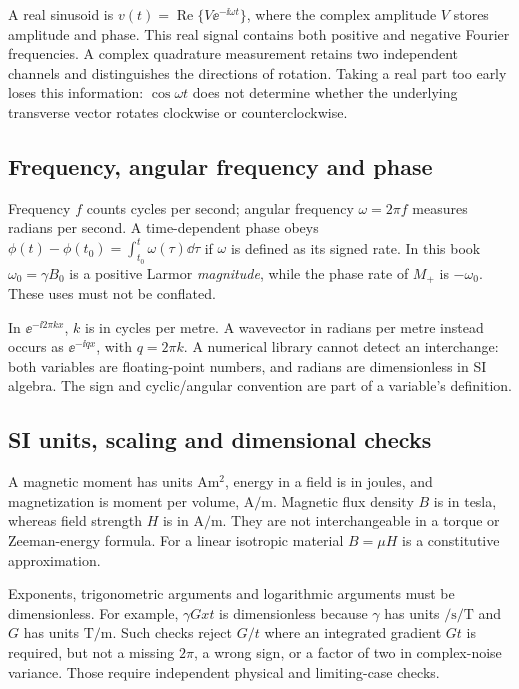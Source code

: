 A real sinusoid is
$v(t)=\operatorname{Re}\{V\ee^{-\ii\omega t}\}$, where the complex
amplitude $V$ stores amplitude and phase. This real signal contains both
positive and negative Fourier frequencies. A complex quadrature measurement
retains two independent channels and distinguishes the directions of
rotation. Taking a real part too early loses this information:
$\cos\omega t$ does not determine whether the underlying transverse
vector rotates clockwise or counterclockwise.

\subsection{Frequency, angular frequency and phase}
Frequency $f$ counts cycles per second; angular frequency
$\omega=2\pi f$ measures radians per second. A time-dependent phase obeys
$\phi(t)-\phi(t_0)=\int_{t_0}^t\omega(\tau)\dd\tau$ if $\omega$ is
defined as its signed rate. In this book $\omega_0=\gamma B_0$
is a positive Larmor \emph{magnitude}, while the phase rate of $M_+$ is
$-\omega_0$. These uses must not be conflated.

In $\ee^{-\ii2\pi kx}$, $k$ is in cycles per metre. A wavevector in
radians per metre instead occurs as $\ee^{-\ii qx}$, with $q=2\pi k$.
A numerical library cannot detect an interchange: both variables are
floating-point numbers, and radians are dimensionless in SI algebra.
The sign and cyclic/angular convention are part of a variable's definition.

\subsection{SI units, scaling and dimensional checks}
A magnetic moment has units $\si{\ampere\square\metre}$, energy in a field
is in joules, and magnetization is moment per volume,
$\si{\ampere\per\metre}$. Magnetic flux density $B$ is in tesla, whereas
field strength $H$ is in $\si{\ampere\per\metre}$.
They are not interchangeable in a torque or Zeeman-energy formula.
For a linear isotropic material $B=\mu H$ is a constitutive approximation.

Exponents, trigonometric arguments and logarithmic arguments must be
dimensionless. For example, $\gamma Gxt$ is dimensionless because
$\gamma$ has units $\si{\per\second\per\tesla}$ and $G$ has units
$\si{\tesla\per\metre}$. Such checks reject $G/t$ where an integrated
gradient $Gt$ is required, but not a missing $2\pi$, a wrong sign,
or a factor of two in complex-noise variance. Those require independent
physical and limiting-case checks.

